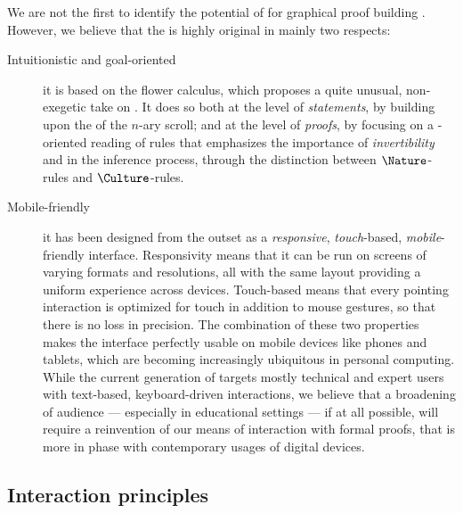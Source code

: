 \begin{scope}
We are not the first to identify the potential of  for graphical proof
building . However, we believe that the
 is highly original in mainly two respects:
\begin{description}
  \item[Intuitionistic and goal-oriented] it is based on the flower
  calculus, which proposes a quite unusual, non-exegetic take on . It does so
  both at the level of \emph{statements}, by building upon the 
   of the $n$-ary scroll; and at the level of \emph{proofs}, by focusing on
  a -oriented reading of rules that emphasizes the importance of
  \emph{invertibility} and \emph{} in the inference process, through
  the distinction between $\Nature$-rules and $\Culture$-rules.
  \item[Mobile-friendly] it has been designed from the outset as a
  \emph{responsive}, \emph{touch}-based, \emph{mobile}-friendly interface.
  Responsivity means that it can be run on screens of varying formats and
  resolutions, all with the same layout providing a uniform experience across
  devices. Touch-based means that every pointing interaction is optimized for
  touch in addition to mouse gestures, so that there is no loss in precision.
  The combination of these two properties makes the interface perfectly usable
  on mobile devices like phones and tablets, which are becoming increasingly
  ubiquitous in personal computing. While the current generation of  targets mostly technical and expert users with text-based,
  keyboard-driven interactions, we believe that a broadening of audience ---
  especially in educational settings --- if at all possible, will require a
  reinvention of our means of interaction with formal proofs, that is more in
  phase with contemporary usages of digital devices.
\end{description}

\subsection{Interaction principles}


\end{scope}
